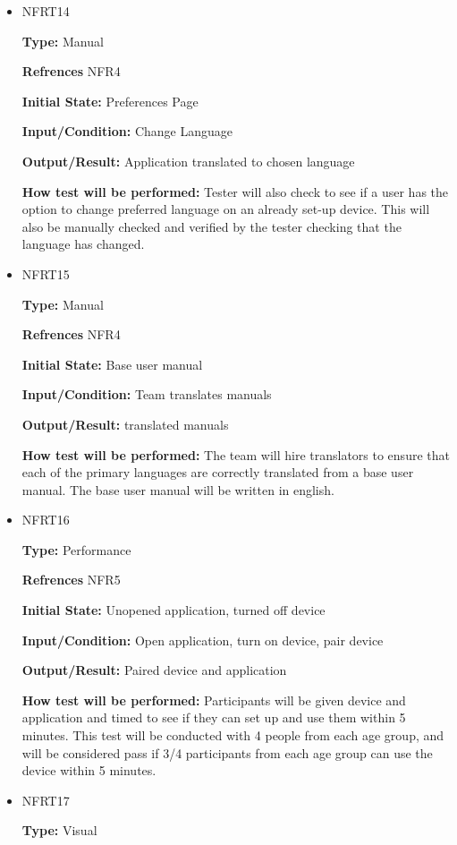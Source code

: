 \documentclass[12pt, titlepage]{article}
\begin{document}
\begin{itemize}
\item{NFRT14}

\textbf{Type:} Manual

\textbf{Refrences} NFR4
					
\textbf{Initial State:} Preferences Page
					
\textbf{Input/Condition:} Change Language
					
\textbf{Output/Result:} Application translated to chosen language
					
\textbf{How test will be performed:} Tester will also check to see if a user has the option to change preferred language on an already set-up device. This will also be manually checked and verified by the tester checking that the language has changed.

\item{NFRT15}

\textbf{Type:} Manual

\textbf{Refrences} NFR4
					
\textbf{Initial State:} Base user manual  
					
\textbf{Input/Condition:} Team translates manuals
					
\textbf{Output/Result:} translated manuals
					
\textbf{How test will be performed:} The team will hire translators to ensure that each of the primary languages are correctly translated from a base user manual. The base user manual will be written in english.

\item{NFRT16}

\textbf{Type:} Performance

\textbf{Refrences} NFR5
					
\textbf{Initial State:} Unopened application, turned off device
					
\textbf{Input/Condition:} Open application, turn on device, pair device
					
\textbf{Output/Result:} Paired device and application
					
\textbf{How test will be performed:} Participants will be given device and application and timed to see if they can set up and use them within 5 minutes. This test will be conducted with 4 people from each age group, and will be considered pass if 3/4 participants from each age group can use the device within 5 minutes.

\item{NFRT17}

\textbf{Type:} Visual


\end{itemize}
\end{document}
